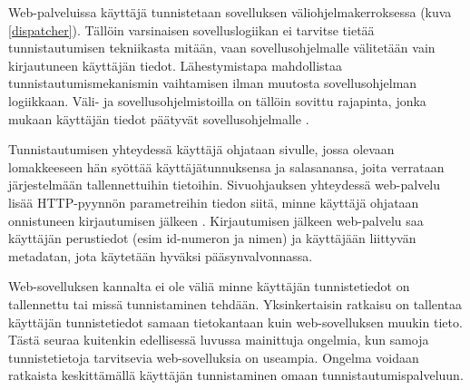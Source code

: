 Web-palveluissa käyttäjä tunnistetaan sovelluksen väliohjelmakerroksessa (kuva \ref{dispatcher}). Tällöin varsinaisen sovelluslogiikan ei tarvitse tietää tunnistautumisen tekniikasta mitään, vaan sovellusohjelmalle välitetään vain kirjautuneen käyttäjän tiedot. Lähestymistapa mahdollistaa tunnistautumismekanismin vaihtamisen ilman muutosta sovellusohjelman logiikkaan. Väli- ja sovellusohjelmistoilla on tällöin sovittu rajapinta, jonka mukaan käyttäjän tiedot päätyvät sovellusohjelmalle \cite{django}.

Tunnistautumisen yhteydessä käyttäjä ohjataan sivulle, jossa olevaan lomakkeeseen hän syöttää käyttäjätunnuksensa ja salasanansa, joita verrataan järjestelmään tallennettuihin tietoihin. Sivuohjauksen yhteydessä web-palvelu lisää HTTP-pyynnön parametreihin tiedon siitä, minne käyttäjä ohjataan onnistuneen kirjautumisen jälkeen \cite{oauth2_0}. Kirjautumisen jälkeen web-palvelu saa käyttäjän perustiedot (esim id-numeron ja nimen) ja käyttäjään liittyvän metadatan, jota käytetään hyväksi pääsynvalvonnassa.

Web-sovelluksen kannalta ei ole väliä minne käyttäjän tunnistetiedot on tallennettu tai missä tunnistaminen tehdään. Yksinkertaisin ratkaisu on tallentaa käyttäjän tunnistetiedot samaan tietokantaan kuin web-sovelluksen muukin tieto. Tästä seuraa kuitenkin edellisessä luvussa mainittuja ongelmia, kun samoja tunnistetietoja tarvitsevia web-sovelluksia on useampia. Ongelma voidaan ratkaista keskittämällä käyttäjän tunnistaminen omaan tunnistautumispalveluun.